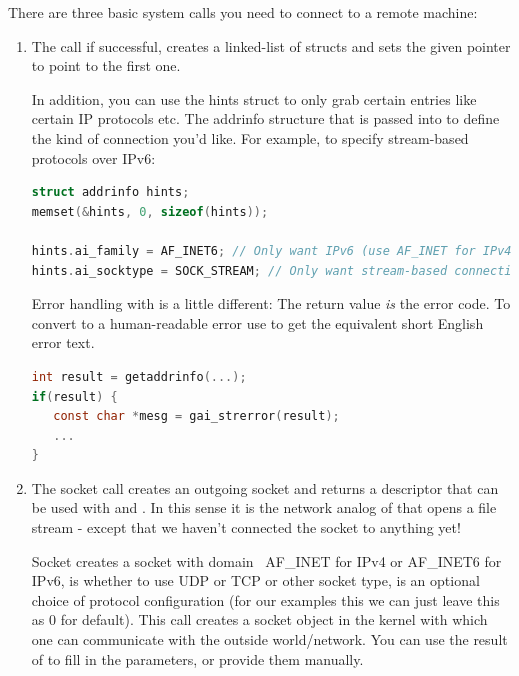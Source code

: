 There are three basic system calls you need to connect to a remote machine:

\begin{enumerate}

\item {}

The  call if successful, creates a linked-list of  structs and sets the given pointer to point to the first one.

In addition, you can use the hints struct to only grab certain entries like certain IP protocols etc. The addrinfo structure that is passed into  to define the kind of connection you'd like.
For example, to specify stream-based protocols over IPv6:

\begin{lstlisting}[language=C]
struct addrinfo hints;
memset(&hints, 0, sizeof(hints));

hints.ai_family = AF_INET6; // Only want IPv6 (use AF_INET for IPv4)
hints.ai_socktype = SOCK_STREAM; // Only want stream-based connection
\end{lstlisting}
Error handling with  is a little different: The return value \emph{is} the error code. To convert to a human-readable error use  to get the equivalent short English error text.

\begin{lstlisting}[language=C]
int result = getaddrinfo(...);
if(result) {
   const char *mesg = gai_strerror(result);
   ...
}
\end{lstlisting}


\item {}

The socket call creates an outgoing socket and returns a descriptor that can be used with  and .
In this sense it is the network analog of  that opens a file stream - except that we haven't connected the socket to anything yet!

Socket creates a socket with domain
~AF\_INET for IPv4 or AF\_INET6 for IPv6,  is whether to use UDP or TCP or other socket type,  is an optional choice of protocol configuration (for our examples this we can just leave this as 0 for default).
This call creates a socket object in the kernel with which one can communicate with the outside world/network.
You can use the result of  to fill in the  parameters, or provide them manually.


\end{enumerate}
